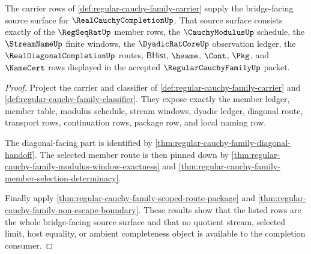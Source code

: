 \begin{theorem}
\label{thm:regular-cauchy-family-standard-bridge-carrier}
The carrier rows of \autoref{def:regular-cauchy-family-carrier} supply the bridge-facing source surface for $\RealCauchyCompletionUp$. That source surface consists exactly of the $\RegSeqRatUp$ member rows, the $\CauchyModulusUp$ schedule, the $\StreamNameUp$ finite windows, the $\DyadicRatCoreUp$ observation ledger, the $\RealDiagonalCompletionUp$ routes, $\mathsf{BHist}$, $\hsame$, $\Cont$, $\Pkg$, and $\NameCert$ rows displayed in the accepted $\RegularCauchyFamilyUp$ packet.
\end{theorem}
\begin{proof}
Project the carrier and classifier of \autoref{def:regular-cauchy-family-carrier} and \autoref{def:regular-cauchy-family-classifier}. They expose exactly the member ledger, member table, modulus schedule, stream windows, dyadic ledger, diagonal route, transport rows, continuation rows, package row, and local naming row.

The diagonal-facing part is identified by \autoref{thm:regular-cauchy-family-diagonal-handoff}. The selected member route is then pinned down by \autoref{thm:regular-cauchy-family-modulus-window-exactness} and \autoref{thm:regular-cauchy-family-member-selection-determinacy}.

Finally apply \autoref{thm:regular-cauchy-family-scoped-route-package} and \autoref{thm:regular-cauchy-family-non-escape-boundary}. These results show that the listed rows are the whole bridge-facing source surface and that no quotient stream, selected limit, host equality, or ambient completeness object is available to the completion consumer.
\end{proof}

